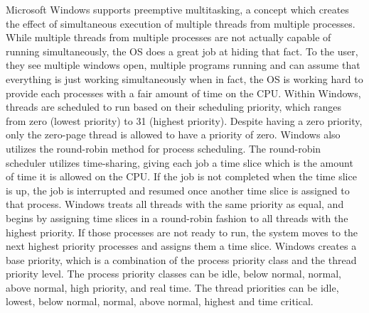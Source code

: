 \documentclass[letterpaper,10pt,draftclsnofoot,onecolumn,titlepage]{IEEEtran}
\begin{document}
		Microsoft Windows supports preemptive multitasking, a concept which creates the effect of simultaneous execution of multiple threads from multiple processes. While multiple threads from multiple processes are not actually capable of running simultaneously, the OS does a great job at hiding that fact. To the user, they see multiple windows open, multiple programs running and can assume that everything is just working simultaneously when in fact, the OS is working hard to provide each processes with a fair amount of time on the CPU. Within Windows, threads are scheduled to run based on their scheduling priority, which ranges from zero (lowest priority) to 31 (highest priority). \cite{Windows} Despite having a zero priority, only the zero-page thread is allowed to have a priority of zero. Windows also utilizes the round-robin method for process scheduling. The round-robin scheduler utilizes time-sharing, giving each job a time slice which is the amount of time it is allowed on the CPU. If the job is not completed when the time slice is up, the job is interrupted and resumed once another time slice is assigned to that process. Windows treats all threads with the same priority as equal, and begins by assigning time slices in a round-robin fashion to all threads with the highest priority. If those processes are not ready to run, the system moves to the next highest priority processes and assigns them a time slice. Windows creates a base priority, which is a combination of the process priority class and the thread priority level. The process priority classes can be idle, below normal, normal, above normal, high priority, and real time. The thread priorities can be idle, lowest, below normal, normal, above normal, highest and time critical.
		\par
\end{document}
